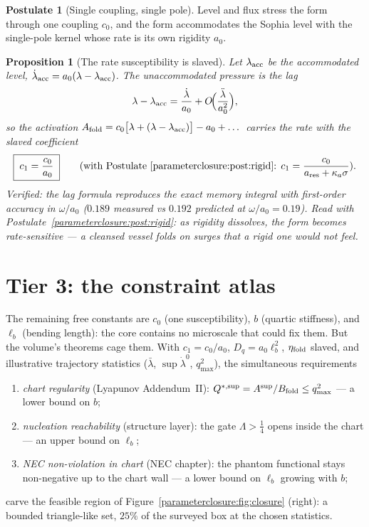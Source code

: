 \documentclass[11pt,a4paper,oneside]{book}
\newcommand{\Afold}{A_{\rm fold}}
\newcommand{\Bfold}{B_{\rm fold}}
\newcommand{\Dq}{D_q}
\newcommand{\lb}{\ell_b}
\newcommand{\etaf}{\eta_{\rm fold}}
\newcommand{\ldz}{\dot\lambda^{0}}
\theoremstyle{plain}
\newtheorem{proposition}{Proposition}[chapter]
\theoremstyle{definition}
\newtheorem{postulate}{Postulate}[chapter]
\theoremstyle{remark}
\begin{document}
\begin{postulate}[Single coupling, single pole]\label{parameterclosure:post:memory}
Level and flux stress the form through one coupling $c_0$, and the form accommodates the Sophia
level with the single-pole kernel whose rate is its own rigidity $a_0$.
\end{postulate}

\begin{proposition}[The rate susceptibility is slaved]\label{parameterclosure:prop:c1}
Let $\lambda_{\rm acc}$ be the accommodated level, $\dot\lambda_{\rm acc}=a_0(\lambda-\lambda_{\rm
acc})$. The unaccommodated pressure is the lag
\begin{equation}
\lambda-\lambda_{\rm acc}=\frac{\dot\lambda}{a_0}+O\!\Bigl(\frac{\ddot\lambda}{a_0^{2}}\Bigr),
\end{equation}
so the activation $\Afold=c_0\bigl[\lambda+(\lambda-\lambda_{\rm acc})\bigr]-a_0+\dots$ carries the
rate with the slaved coefficient
\begin{equation}
\boxed{\;c_1=\frac{c_0}{a_0}\;}
\qquad\text{(with Postulate~\ref{parameterclosure:post:rigid}: }c_1=\frac{c_0}{a_{\rm res}+\kappa_a\sigma}\text{).}
\end{equation}
Verified: the lag formula reproduces the exact memory integral with first-order accuracy in
$\omega/a_0$ ($0.189$ measured vs $0.192$ predicted at $\omega/a_0=0.19$). Read with
Postulate~\ref{parameterclosure:post:rigid}: as rigidity dissolves, the form becomes \emph{rate-sensitive} --- a
cleansed vessel folds on surges that a rigid one would not feel.
\end{proposition}

\section{Tier 3: the constraint atlas}

The remaining free constants are $c_0$ (one susceptibility), $b$ (quartic stiffness), and $\lb$
(bending length): the core contains no microscale that could fix them. But the volume's theorems
cage them. With $c_1=c_0/a_0$, $\Dq=a_0\lb^2$, $\etaf$ slaved, and illustrative trajectory
statistics ($\bar\lambda$, $\sup\ldz$, $q_{\max}^2$), the simultaneous requirements
\begin{enumerate}[label=(\roman*),leftmargin=1.8em,itemsep=2pt]
\item \emph{chart regularity} (Lyapunov Addendum~II): $Q^{*,\sup}=A^{\sup}/\Bfold\le q_{\max}^2$
--- a lower bound on $b$;
\item \emph{nucleation reachability} (structure layer): the gate $\Lambda>\tfrac14$ opens inside
the chart --- an upper bound on $\lb$;
\item \emph{NEC non-violation in chart} (NEC chapter): the phantom functional stays non-negative up
to the chart wall --- a lower bound on $\lb$ growing with $b$;
\end{enumerate}
carve the feasible region of Figure~\ref{parameterclosure:fig:closure} (right): a bounded triangle-like set, $25\%$
of the surveyed box at the chosen statistics.
\end{document}
